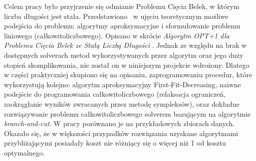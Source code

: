 \begin{streszczenie}

Celem pracy było przyjrzenie się odmianie Problemu Cięcia Belek, w którym liczba długości jest stała. Przedstawiono  w ujęciu teoretycznym możliwe podejścia do problemu: algorytmy aproksymacyjne i sformułowanie problemu liniowego (całkowitoliczbowego). Opisano w skrócie
\textit{Algorytm OPT+1 dla Problemu Cięcia Belek ze Stałą Liczbą Długości} \cite{ALG_OPT_1}. Jednak ze względu na brak w dostępnych solverach metod wykorzystywanych przez algorytm oraz jego duży stopień skomplikowania, nie został on w niniejszym projekcie wdrożony. Dlatego w części praktyczniej skupiono się na opisaniu, zaprogramowaniu procedur, które wykorzystują kolejno: algorytm aproksymacyjny First-Fit-Decreasing, naiwne podejście do programowania całkowitoliczbowego (relaksacja ograniczeń, zaokrąglanie wyników zwracanych przez metodę sympleksów), oraz dokładne rozwiązywanie problemu całkowitoliczbowego solverem bazującym na algorytmie \textit{branch-and-cut}. W pracy porównano je na przykładowych zbiorach danych. Okazało się, że w większości przypadków rozwiązania uzyskane algorytmami przybliżającymi posiadały koszt nie różniący się o więcej niż 1 od kosztu optymalnego. 
	
\end{streszczenie}
